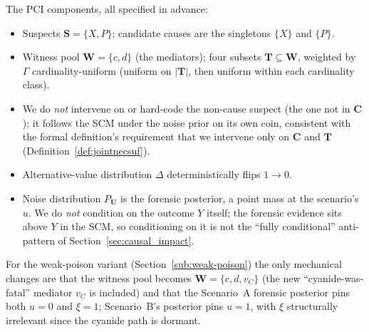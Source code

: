 The PCI components, all specified in advance:
\begin{itemize}\setlength\itemsep{0.1em}
    \item Suspects $\mathbf{S} = \{X, P\}$; candidate causes are the
        singletons $\{X\}$ and $\{P\}$.
    \item Witness pool $\mathbf{W} = \{c, d\}$ (the mediators); four subsets
        $\mathbf{T} \subseteq \mathbf{W}$, weighted by $\Gamma$
        cardinality-uniform (uniform on $|\mathbf{T}|$, then uniform within
        each cardinality class).
    \item We do \emph{not} intervene on or hard-code the non-cause suspect
        (the one not in $\mathbf{C}$); it follows the SCM under the noise
        prior on its own coin, consistent with the formal definition's
        requirement that we intervene only on $\mathbf{C}$ and $\mathbf{T}$
        (Definition~\ref{def:jointnecsuf}).
    \item Alternative-value distribution $\Delta$ deterministically flips
        $1 \to 0$.
    \item Noise distribution $P_{\mathbf{U}}$ is the forensic posterior, a
        point mass at the scenario's $u$. We do \emph{not} condition on the
        outcome $Y$ itself; the forensic evidence sits above $Y$ in the SCM,
        so conditioning on it is not the ``fully conditional'' anti-pattern of
        Section~\ref{sec:causal_impact}.
\end{itemize}

For the weak-poison variant (Section~\ref{sub:weak-poison}) the only mechanical
changes are that the witness pool becomes $\mathbf{W} = \{c, d, v_C\}$ (the new
``cyanide-was-fatal'' mediator $v_C$ is included) and that the Scenario~A
forensic posterior pins both $u = 0$ and $\xi = 1$; Scenario~B's posterior pins
$u = 1$, with $\xi$ structurally irrelevant since the cyanide path is dormant.
